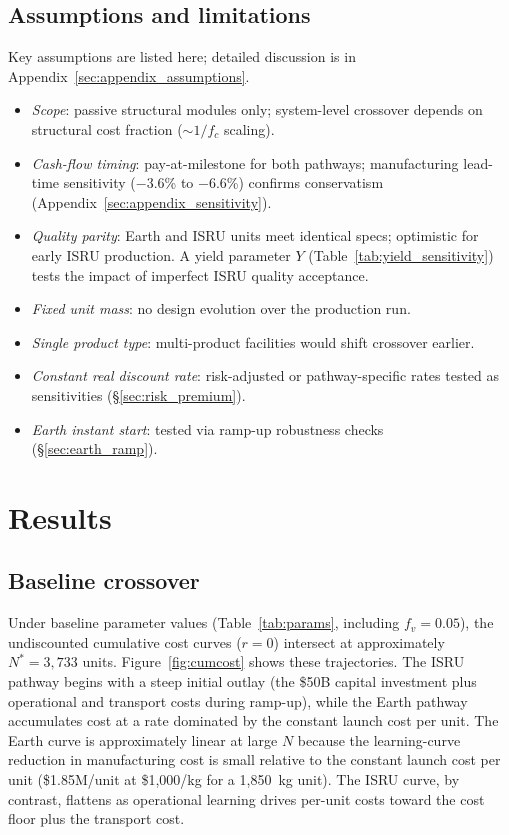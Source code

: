 \documentclass[preprint,12pt]{elsarticle}
\begin{document}
\subsection{Assumptions and limitations}

Key assumptions are listed here; detailed discussion is in Appendix~\ref{sec:appendix_assumptions}.
\begin{itemize}
  \item \emph{Scope}: passive structural modules only; system-level crossover depends on structural cost fraction ($\sim$$1/f_c$ scaling).
  \item \emph{Cash-flow timing}: pay-at-milestone for both pathways; manufacturing lead-time sensitivity ($-$3.6\% to $-$6.6\%) confirms conservatism (Appendix~\ref{sec:appendix_sensitivity}).
  \item \emph{Quality parity}: Earth and ISRU units meet identical specs; optimistic for early ISRU production. A yield parameter $Y$ (Table~\ref{tab:yield_sensitivity}) tests the impact of imperfect ISRU quality acceptance.
  \item \emph{Fixed unit mass}: no design evolution over the production run.
  \item \emph{Single product type}: multi-product facilities would shift crossover earlier.
  \item \emph{Constant real discount rate}: risk-adjusted or pathway-specific rates tested as sensitivities (\S\ref{sec:risk_premium}).
  \item \emph{Earth instant start}: tested via ramp-up robustness checks (\S\ref{sec:earth_ramp}).
\end{itemize}

\section{Results}
\label{sec:results}

\subsection{Baseline crossover}

Under baseline parameter values (Table~\ref{tab:params}, including $f_v = 0.05$), the undiscounted cumulative cost curves ($r = 0$) intersect at approximately $N^* = 3{,}733$ units. Figure~\ref{fig:cumcost} shows these trajectories. The ISRU pathway begins with a steep initial outlay (the \$50B capital investment plus operational and transport costs during ramp-up), while the Earth pathway accumulates cost at a rate dominated by the constant launch cost per unit. The Earth curve is approximately linear at large $N$ because the learning-curve reduction in manufacturing cost is small relative to the constant launch cost per unit (\$1.85M/unit at \$1{,}000/kg for a 1{,}850~kg unit). The ISRU curve, by contrast, flattens as operational learning drives per-unit costs toward the cost floor plus the transport cost.
\end{document}
